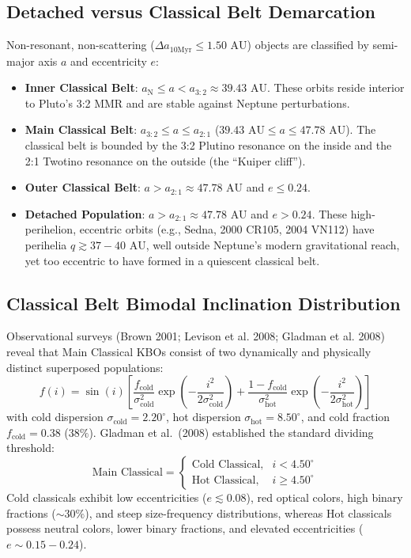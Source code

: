 \documentclass[11pt,a4paper]{article}
\begin{document}
\subsection{Detached versus Classical Belt Demarcation}
Non-resonant, non-scattering ($\Delta a_{10\text{Myr}} \le 1.50\text{ AU}$) objects are classified by semi-major axis $a$ and eccentricity $e$:
\begin{itemize}
    \item \textbf{Inner Classical Belt}: $a_{\text{N}} \le a < a_{3:2} \approx 39.43\text{ AU}$. These orbits reside interior to Pluto's 3:2 MMR and are stable against Neptune perturbations.
    \item \textbf{Main Classical Belt}: $a_{3:2} \le a \le a_{2:1}$ ($39.43\text{ AU} \le a \le 47.78\text{ AU}$). The classical belt is bounded by the 3:2 Plutino resonance on the inside and the 2:1 Twotino resonance on the outside (the ``Kuiper cliff'').
    \item \textbf{Outer Classical Belt}: $a > a_{2:1} \approx 47.78\text{ AU}$ and $e \le 0.24$.
    \item \textbf{Detached Population}: $a > a_{2:1} \approx 47.78\text{ AU}$ and $e > 0.24$. These high-perihelion, eccentric orbits (e.g., Sedna, 2000 CR105, 2004 VN112) have perihelia $q \gtrsim 37-40\text{ AU}$, well outside Neptune's modern gravitational reach, yet too eccentric to have formed in a quiescent classical belt.
\end{itemize}

\subsection{Classical Belt Bimodal Inclination Distribution}
Observational surveys (Brown 2001; Levison et al. 2008; Gladman et al. 2008) reveal that Main Classical KBOs consist of two dynamically and physically distinct superposed populations:
\begin{equation}
f(i) = \sin(i) \left[ \frac{f_{\text{cold}}}{\sigma_{\text{cold}}^2} \exp\left(-\frac{i^2}{2\sigma_{\text{cold}}^2}\right) + \frac{1 - f_{\text{cold}}}{\sigma_{\text{hot}}^2} \exp\left(-\frac{i^2}{2\sigma_{\text{hot}}^2}\right) \right]
\end{equation}
with cold dispersion $\sigma_{\text{cold}} = 2.20^\circ$, hot dispersion $\sigma_{\text{hot}} = 8.50^\circ$, and cold fraction $f_{\text{cold}} = 0.38$ ($38\%$). Gladman et al.\ (2008) established the standard dividing threshold:
\begin{equation}
\text{Main Classical} = \begin{cases}
\text{Cold Classical}, & i < 4.50^\circ \\
\text{Hot Classical}, & i \ge 4.50^\circ
\end{cases}
\end{equation}
Cold classicals exhibit low eccentricities ($e \lesssim 0.08$), red optical colors, high binary fractions ($\sim 30\%$), and steep size-frequency distributions, whereas Hot classicals possess neutral colors, lower binary fractions, and elevated eccentricities ($e \sim 0.15-0.24$).
\end{document}
